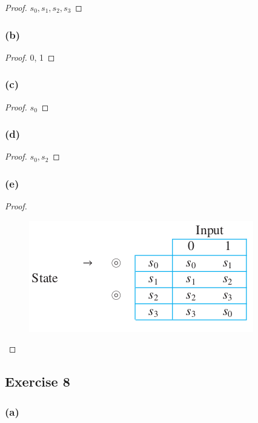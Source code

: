 \documentclass[14pt]{extarticle}
\begin{document}
\begin{proof}
\(s_0, s_1, s_2, s_3\)
\end{proof}

\subsubsection{(b)}

\begin{proof}
0, 1 
\end{proof}

\subsubsection{(c)}

\begin{proof}
\(s_0\)
\end{proof}

\subsubsection{(d)}

\begin{proof}
\(s_0, s_2\)
\end{proof}

\subsubsection{(e)}

\begin{proof}
\begin{figure}[ht!]
\centering
\includegraphics[scale=0.5]{../images/12.2.7.e.png}
\end{figure}
\end{proof}

\subsection{Exercise 8}

\subsubsection{(a)}
\end{document}
